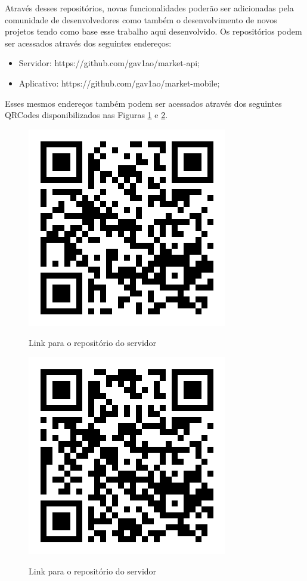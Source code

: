 Através desses repositórios, novas funcionalidades poderão ser adicionadas pela comunidade de desenvolvedores como também o desenvolvimento de novos projetos tendo como base esse trabalho aqui desenvolvido. Os repositórios podem ser acessados através dos seguintes endereços:
\begin{itemize}
\item Servidor: https://github.com/gav1ao/market-api;
\item Aplicativo: https://github.com/gav1ao/market-mobile;
\end{itemize}

Esses mesmos endereços também podem ser acessados através dos seguintes QRCodes disponibilizados nas Figuras \ref{fig-repo-qrcode-api} e \ref{fig-repo-qrcode-app}.

\begin{figure}[h]
    \centering
    \caption{Link para o repositório do servidor}
    \includegraphics[scale=0.5]{tcc/figures/repo_qrcode/repo_github_market_api.png}
    \label{fig-repo-qrcode-api}
\end{figure}

\begin{figure}[h]
    \centering
    \caption{Link para o repositório do servidor}
    \includegraphics[scale=0.5]{tcc/figures/repo_qrcode/repo_github_market_app.png}
    \label{fig-repo-qrcode-app}
\end{figure}
